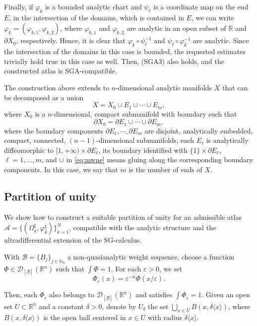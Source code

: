 \documentclass[11pt,reqno]{amsart}
\numberwithin{equation}{section}
\newcommand{\R}{{\mathbb{R}}} %
\newcommand{\Bj}{{\{B_j\}_{j\in\mathbb{N}_0}}} %
\newcommand{\B}{{\mathcal{B}}} %
\begin{document}
Finally, if $\varphi_k$ is a bounded analytic chart and $\psi_\ell$ is a coordinate map on the end $E$, in the intersection of the domains, which is contained in $E$, we can write $\varphi_k=(\varphi_{k,1},\varphi_{k,2})$, where $\varphi_{k,1}$ and $\varphi_{k,2}$ are analytic in an open subset of $\mathbb{R}$ and $\partial X_0$, respectively. Hence, it is clear that $\varphi_k\circ\psi_\ell^{-1}$ and $\psi_\ell\circ\varphi_k^{-1}$ are analytic. Since the intersection of the domains in this case is bounded, the requested estimates trivially hold true in this case as well. Then, (SGA3) also holds, and the constructed atlas is SGA-compatible.

The construction above extends to $n$-dimensional analytic manifolds $X$ that can be decomposed as a union
%
\begin{equation}\label{eq:mwne}
	X=X_0\cup E_1\cup\cdots\cup E_m,
\end{equation}
%
where $X_0$ is a $n$-dimensional, compact submanifold with boundary such that
%
\[\partial X_0 = \partial E_1\cup\cdots\cup\partial E_m,\]
%
where the boundary components $\partial E_1,\cdots,\partial E_m$ are disjoint, analytically embedded, compact, connected, $(n-1)$-dimensional submanifolds, each $E_\ell$ is 
analytically diffeomorphic to $ [1,+\infty)\times\partial E_\ell$, its boundary identified with $\{1\}\times \partial E_\ell$, $\ell=1,\dots,m$, and $\cup$
in \eqref{eq:mwne} means gluing along the corresponding boundary components. In this case, we say that $m$ is the number of ends of $X$.


\subsection{Partition of unity} 
We show how to construct a suitable partition of unity for an admissible atlas $\mathscr{A} = \{(\Omega_k^\sharp,\varphi_k^\sharp)\}_{k=1}^N$,
compatible with the analytic structure and the ultradifferential extension of the SG-calculus. 

With $\B=\Bj$ a non-quasianalytic weight sequence, choose a function $\Phi \in \mathcal{D}_{[\B]} (\mathbb{R}^n)$ such that $\int\Phi=1$.
For each $\varepsilon>0$, we set
%
\[\Phi_\varepsilon(x) = \varepsilon^{-n}\Phi(x/\varepsilon).\]

Then, each $\Phi_\varepsilon$ also belongs to $\mathcal{D}_{[\B]}(\R^n)$ and satisfies $\int\Phi_\varepsilon=1$. Given an open set $U\subset\mathbb{R}^n$ and a constant $\delta>0$, denote by $U_\delta$ the set $\bigcup_{x\in U}B(x,\delta\langle x\rangle)$, where $B(x,\delta\langle x\rangle)$ is the open ball centered in $x\in U$ with radius $\delta\langle x\rangle$.
\end{document}
